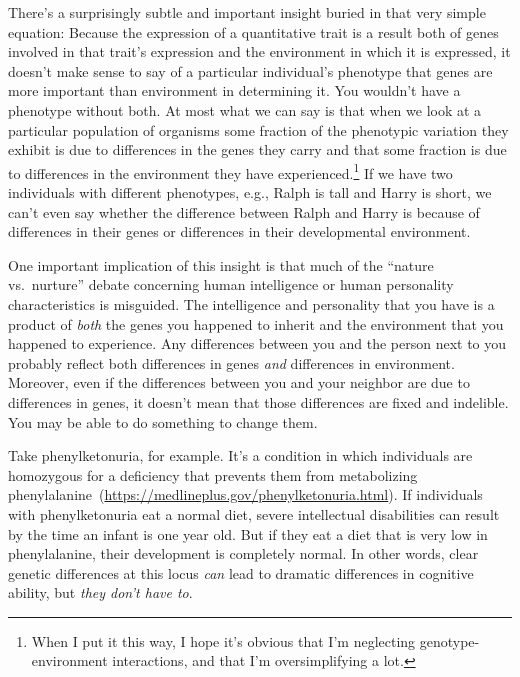 \documentclass[12pt]{article}
\begin{document}
There's a surprisingly subtle and important insight buried in that
very simple equation: Because the expression of a quantitative trait
is a result both of genes involved in that trait's expression and the
environment in which it is expressed, it doesn't make sense to say of
a particular individual's phenotype that genes are more important than
environment in determining it. You wouldn't have a phenotype without
both. At most what we can say is that when we look at a particular
population of organisms some fraction of the phenotypic variation they
exhibit is due to differences in the genes they carry and that some
fraction is due to differences in the environment they have
experienced.\footnote{When I put it this way, I hope it's obvious that
  I'm neglecting genotype-environment interactions, and that I'm
  oversimplifying a lot.} If we have two
individuals with different phenotypes, e.g., Ralph is tall and Harry
is short, we can't even say whether the difference between Ralph and
Harry is because of differences in their genes or differences in their
developmental environment.

One important implication of this insight is that much of the ``nature
vs.\ nurture'' debate concerning human intelligence or human
personality characteristics is misguided. The intelligence and
personality that you have is a product of {\it both} the genes you
happened to inherit and the environment that you happened to
experience. Any differences between you and the person next to you
probably reflect both differences in genes {\it and\/} differences in
environment. Moreover, even if the differences between you and your
neighbor are due to differences in genes, it doesn't mean that those
differences are fixed and indelible. You may be able to do something
to change them.

Take phenylketonuria, for example. It's a condition in which
individuals are homozygous for a deficiency that prevents them from
metabolizing
phenylalanine~(\url{https://medlineplus.gov/phenylketonuria.html}).
If individuals with phenylketonuria eat a normal diet, severe
intellectual disabilities can result by the time an infant is one year
old. But if they eat a diet that is very low in phenylalanine, their
development is completely normal. In other
words, clear genetic differences at this locus {\it can\/} lead to
dramatic differences in cognitive ability, but {\it they don't have
  to}.
\end{document}
